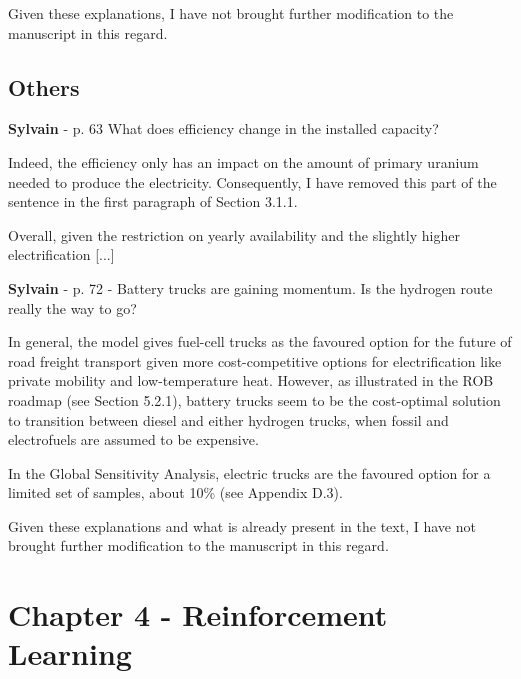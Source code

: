 \documentclass[12pt,a4paper]{article}
\begin{document}
Given these explanations, I have not brought further modification to the manuscript in this regard.


\subsection{Others}

\begin{mdframed}[style=comment] %
{\color{purple} \textbf{Sylvain}} - p. 63 What does efficiency change in the installed capacity?
\end{mdframed}

\noindent Indeed, the efficiency only has an impact on the amount of primary uranium needed to produce the electricity. Consequently, I have removed this part of the sentence {\color{blue}in the first paragraph of Section 3.1.1}. 

\begin{mdframed}[style=manuscript] %
Overall, given the restriction on yearly availability and the slightly higher electrification [...]
\end{mdframed}

\begin{mdframed}[style=comment] %
{\color{purple} \textbf{Sylvain}} - p. 72 - Battery trucks are gaining momentum. Is the hydrogen route really the way to go?
\end{mdframed}

\noindent In general, the model gives fuel-cell trucks as the favoured option for the future of road freight transport given more cost-competitive options for electrification like private mobility and low-temperature heat. However, as illustrated in the ROB roadmap (see Section 5.2.1), battery trucks seem to be the cost-optimal solution to transition between diesel and either hydrogen trucks, when fossil and electrofuels are assumed to be expensive. 

In the Global Sensitivity Analysis, electric trucks are the favoured option for a limited set of samples, about 10\% (see Appendix D.3).

Given these explanations and what is already present in the text, I have not brought further modification to the manuscript in this regard.

\section{Chapter 4 - Reinforcement Learning}
\label{Chap_RL}
\end{document}
